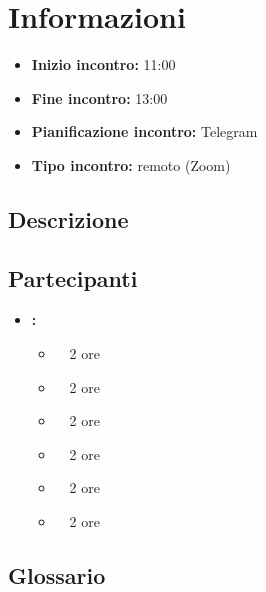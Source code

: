\section{Informazioni}
\begin{itemize}
	\item \textbf{Inizio incontro:} 11:00
	\item \textbf{Fine incontro:} 13:00
	\item \textbf{Pianificazione incontro:} Telegram
	\item \textbf{Tipo incontro:} remoto (Zoom)
\end{itemize}

\subsection{Descrizione}
\DocDescription

\subsection{Partecipanti}

\begin{itemize}
	\item \textbf{\GroupName:}
	\begin{itemize}
		\item \tommaso \ \rightarrow\ 2 ore
		\item \marco \ \rightarrow\ 2 ore
		\item \riccardo \ \rightarrow\ 2 ore
		\item \raul \ \rightarrow\ 2 ore
		\item \martina \ \rightarrow\ 2 ore
		\item \sebastiano \ \rightarrow\ 2 ore
	\end{itemize}
\end{itemize}

\subsection{Glossario}
\GlossarioIntroduzione

\clearpage